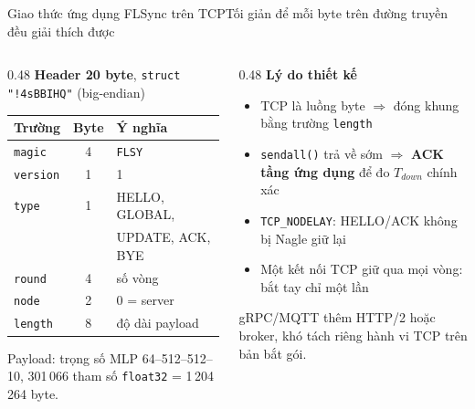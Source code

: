 \documentclass[aspectratio=169,10pt]{beamer}
\begin{document}
\begin{frame}{Giao thức ứng dụng FLSync trên TCP}{Tối giản để mỗi byte trên đường truyền đều giải thích được}
  \begin{columns}[T]
    \begin{column}{0.48\textwidth}
      \textbf{Header 20 byte}, \texttt{struct "!4sBBIHQ"} (big-endian)
      \vspace{3pt}

      \small
      \begin{tabular}{l c l}
        \toprule
        \textbf{Trường} & \textbf{Byte} & \textbf{Ý nghĩa} \\
        \midrule
        \texttt{magic} & 4 & \texttt{FLSY} \\
        \texttt{version} & 1 & 1 \\
        \texttt{type} & 1 & HELLO, GLOBAL, \\
         &  & UPDATE, ACK, BYE \\
        \texttt{round} & 4 & số vòng \\
        \texttt{node} & 2 & 0 = server \\
        \texttt{length} & 8 & độ dài payload \\
        \bottomrule
      \end{tabular}
      \vspace{4pt}

      \scriptsize Payload: trọng số MLP 64--512--512--10, 301\,066 tham số \texttt{float32} = 1\,204\,264 byte.
    \end{column}
    \begin{column}{0.48\textwidth}
      \textbf{Lý do thiết kế}
      \begin{itemize}
        \item TCP là luồng byte $\Rightarrow$ đóng khung bằng trường \texttt{length}
        \item \texttt{sendall()} trả về sớm $\Rightarrow$ \textbf{ACK tầng ứng dụng} để đo $T_{down}$ chính xác
        \item \texttt{TCP\_NODELAY}: HELLO/ACK không bị Nagle giữ lại
        \item Một kết nối TCP giữ qua mọi vòng: bắt tay chỉ một lần
      \end{itemize}
      \vspace{3pt}
      \scriptsize gRPC/MQTT thêm HTTP/2 hoặc broker, khó tách riêng hành vi TCP trên bản bắt gói.
    \end{column}
  \end{columns}
\end{frame}
\end{document}
